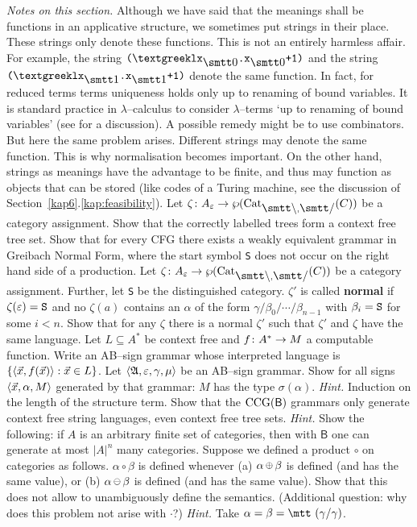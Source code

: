 {\it Notes on this section.} Although we have said that the
meanings shall be functions in an applicative structure, we
sometimes put strings in their place. These strings only denote 
these functions. This is not an entirely harmless affair. For example,
the string $\mbox{\tt (\stlambda x}_{\snull}\mbox{\tt .x}_{\snull}%
\mbox{\tt +1)}$ and the string $\mbox{\tt (\stlambda x}_{\seins}%
\mbox{\tt .x}_{\seins}\mbox{\tt +1)}$ denote the same function. In 
fact, for reduced terms terms uniqueness
holds only up to renaming of bound variables. It is standard practice
in $\lambda$--calculus to consider $\lambda$--terms `up to renaming
of bound variables' (see \cite{pigozzisalibra:vb} for a discussion).
A possible remedy might be to use combinators. But here the same
problem arises. Different strings may denote the same function. This
is why normalisation becomes important. On the other hand, strings as
meanings have the advantage to be finite, and thus may function as
objects that can be stored (like codes of a Turing machine, see the
discussion of Section~\ref{kap6}.\ref{kap:feasibility}).
\vplatz
\exercise
Let $\zeta \colon A_{\varepsilon} \pf \wp(\Cat_{\mbox{\smtt\tb}, %
\mbox{\smtt\tf}}(C))$ be a category assignment. Show that the correctly 
labelled trees form a context free tree set.
\vplatz
\exercise
Show that for every CFG there exists a weakly equivalent grammar 
in Greibach Normal Form, where the start symbol {\tt S} does not occur 
on the right hand side of a production.
\vplatz
\exercise
Let $\zeta \colon A_{\varepsilon} \pf \wp(\Cat_{\mbox{\smtt\tb}, %
\mbox{\smtt\tf}}(C))$ be a category assignment. Further, let {\tt S} 
be the distinguished category. $\zeta'$ is called \textbf{normal} if
$\zeta(\varepsilon) = \mbox{\tt S}$ and no $\zeta(a)$ contains
an $\alpha$ of the form $\gamma/\beta_0/\dotsb/\beta_{n-1}$
with $\beta_i = \mbox{\tt S}$ for some $i < n$. Show that
for any $\zeta$ there is a normal $\zeta'$ such that $\zeta'$ and
$\zeta$ have the same language.
\vplatz
\exercise
Let $L \subseteq A^{\ast}$ be context free and $f \colon A^{\ast} \rightarrow M$ 
a computable function. Write an AB--sign grammar whose 
interpreted language is $\{\langle \vec{x}, f(\vec{x})\rangle : \vec{x} \in L\}$.
\vplatz
\exercise
Let $\langle \mathfrak{A}, \varepsilon, \gamma,\mu\rangle$ be an AB--sign 
grammar. Show for all signs $\langle \vec{x}, \alpha, M\rangle$ generated 
by that grammar: $M$ has the type $\sigma(\alpha)$.  {\it Hint.} 
Induction on the length of the structure term.
\vplatz 
\exercise 
\label{ueb:ab} 
Show that the $\operatorname{CCG}(\mathsf{B})$ grammars only generate context free 
string languages, even context free tree sets. {\it Hint.} Show the 
following: if $A$ is an arbitrary finite set of categories, then with 
$\mathsf{B}$ one can generate at most $|A|^n$ many categories.
\vplatz
\exercise
Suppose we defined a product $\circ$ on categories as follows. 
$\alpha \circ \beta$ is defined whenever (a) $\alpha 
\circplus \beta$ is defined (and has the same value), or 
(b) $\alpha \circminus \beta$ is defined (and has the same value). 
Show that this does not 
allow to unambiguously define the semantics. (Additional question: 
why does this problem not arise with $\cdot$?) {\it Hint.} Take 
$\alpha = \beta = \mbox{\mtt ($\gamma${\tf}$\gamma$)}$. 
